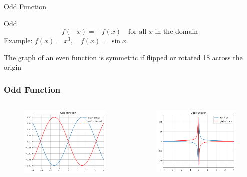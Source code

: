 \documentclass{beamer}
\begin{document}
\begin{frame}{Odd Function}
\begin{block}{Odd}
        \[
        f(-x) = -f(x) \quad \text{for all } x \text{ in the domain}
        \]
        Example: \( f(x) = x^3, \quad f(x) = \sin x \)
\end{block}
The graph of an even function is symmetric if flipped or rotated 18 across the origin 
\end{frame}

\begin{frame}
  \frametitle{Odd Function}
  \begin{columns}[T]
    \begin{column}{0.5\textwidth}
    \begin{figure}[t]
    \includegraphics[width=\linewidth]{odd.png}
    \end{figure}
  \end{column}

  \begin{column}{0.5\textwidth}
    \begin{figure}[t]
    \includegraphics[width=\linewidth]{odd2.png}
    \end{figure}
  \end{column}

\end{columns}

  

\end{frame}
\end{document}
